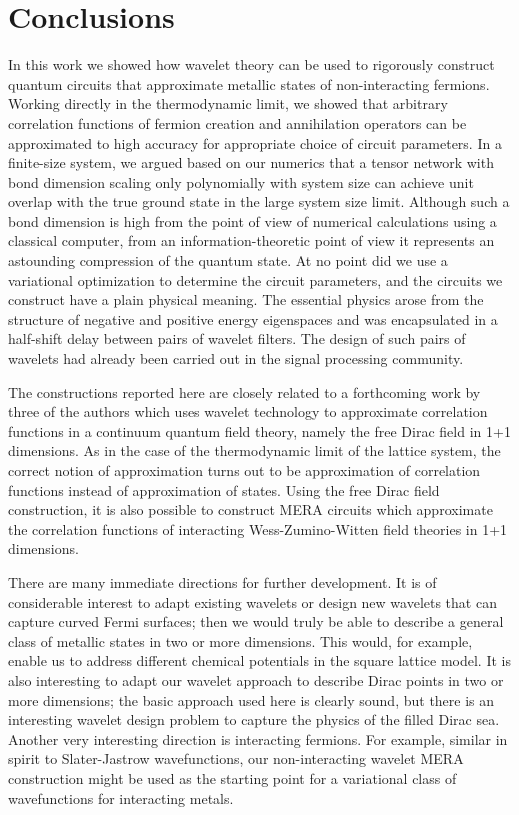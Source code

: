 \documentclass[aps,pra,reprint,superscriptaddress,floatfix,amsmath,amssymb,amsfonts]{revtex4-1}
\begin{document}
\section{Conclusions}\label{sec:conclusions}
In this work we showed how wavelet theory can be used to rigorously construct quantum circuits that approximate metallic states of non-interacting fermions.
Working directly in the thermodynamic limit, we showed that arbitrary correlation functions of fermion creation and annihilation operators can be approximated to high accuracy for appropriate choice of circuit parameters.
In a finite-size system, we argued based on our numerics that a tensor network with bond dimension scaling only polynomially with system size can achieve unit overlap with the true ground state in the large system size limit.
Although such a bond dimension is high from the point of view of numerical calculations using a classical computer, from an information-theoretic point of view it represents an astounding compression of the quantum state.
At no point did we use a variational optimization to determine the circuit parameters, and the circuits we construct have a plain physical meaning.
The essential physics arose from the structure of negative and positive energy eigenspaces and was encapsulated in a half-shift delay between pairs of wavelet filters.
The design of such pairs of wavelets had already been carried out in the signal processing community.

The constructions reported here are closely related to a forthcoming work by three of the authors which uses wavelet technology to approximate correlation functions in a continuum quantum field theory, namely the free Dirac field in 1+1 dimensions.
As in the case of the thermodynamic limit of the lattice system, the correct notion of approximation turns out to be approximation of correlation functions instead of approximation of states.
Using the free Dirac field construction, it is also possible to construct MERA circuits which approximate the correlation functions of interacting Wess-Zumino-Witten field theories in 1+1 dimensions.

There are many immediate directions for further development.
It is of considerable interest to adapt existing wavelets or design new wavelets that can capture curved Fermi surfaces; then we would truly be able to describe a general class of metallic states in two or more dimensions.
This would, for example, enable us to address different chemical potentials in the square lattice model.
It is also interesting to adapt our wavelet approach to describe Dirac points in two or more dimensions; the basic approach used here is clearly sound, but there is an interesting wavelet design problem to capture the physics of the filled Dirac sea.
Another very interesting direction is interacting fermions.
For example, similar in spirit to Slater-Jastrow wavefunctions, our non-interacting wavelet MERA construction might be used as the starting point for a variational class of wavefunctions for interacting metals.
\end{document}
